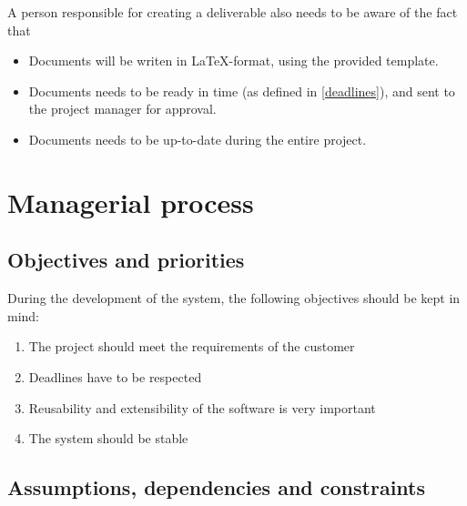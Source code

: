 \documentclass[a4paper, 12pt]{report}
\begin{document}
			A person responsible for creating a deliverable also needs to be aware
			of the fact that
			
			\begin{itemize}
				
				\item Documents will be writen in \LaTeX-format, using the provided template.
				
				\item Documents needs to be ready in time (as defined in \ref{deadlines}), and
				sent to the project manager for approval. 
				
				\item Documents needs to be up-to-date during the entire project. 
				
			\end{itemize}
			
	\chapter{Managerial process}
		
		\section{Objectives and priorities}
			
			During the development of the system, the following objectives should be kept
			in mind:
			
			\begin{enumerate}
				
				\item The project should meet the requirements of the customer
				\item Deadlines have to be respected
				\item Reusability and extensibility of the software is very important
				\item The system should be stable
				
			\end{enumerate}	
			
		\section{Assumptions, dependencies and constraints}
			
\end{document}
